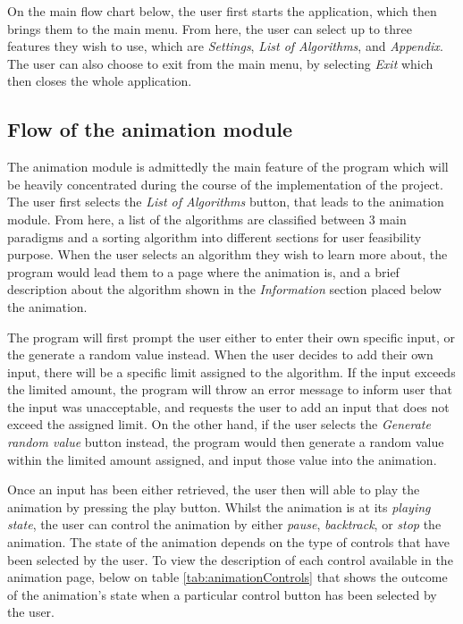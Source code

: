 On the main flow chart below, the user first starts the application, which then brings them to the main menu. From here, the user can select up to three features they wish to use, which are \textit{Settings}, \textit{List of Algorithms}, and \textit{Appendix}. The user can also choose to exit from the main menu, by selecting \textit{Exit} which then closes the whole application.

\subsection{Flow of the animation module} \label{sec:flowchartAnimation}
The animation module is admittedly the main feature of the program which will be heavily concentrated during the course of the implementation of the project. The user first selects the \textit{List of Algorithms} button, that leads to the animation module. From here, a list of the algorithms are classified between 3 main paradigms and a sorting algorithm into different sections for user feasibility purpose. When the user selects an algorithm they wish to learn more about, the program would lead them to a page where the animation is, and a brief description about the algorithm shown in the \textit{Information} section placed below the animation. 

The program will first prompt the user either to enter their own specific input, or the generate a random value instead. When the user decides to add their own input, there will be a specific limit assigned to the algorithm. If the input exceeds the limited amount, the program will throw an error message to inform user that the input was unacceptable, and requests the user to add an input that does not exceed the assigned limit. On the other hand, if the user selects the \textit{Generate random value} button instead, the program would then generate a random value within the limited amount assigned, and input those value into the animation.

Once an input has been either retrieved, the user then will able to play the animation by pressing the play button. Whilst the animation is at its \textit{playing state}, the user can control the animation by either \textit{pause}, \textit{backtrack}, or \textit{stop} the animation. The state of the animation depends on the type of controls that have been selected by the user. To view the description of each control available in the animation page, below on table \ref{tab:animationControls} that shows the outcome of the animation's state when a particular control button has been selected by the user.

